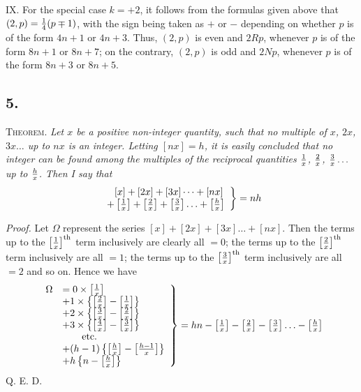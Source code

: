 \documentclass[twoside,12pt]{memoir}
\let\oldfrac\frac
\def\frac#1#2{\mathchoice{\tfrac{#1}{#2}}{\oldfrac{#1}{#2}}{\genfrac{}{}{}{2}{#1}{#2\mathstrut}}{\genfrac{}{}{}{3}{#1}{#2\mathstrut}}}
\begin{document}
IX. For the special case \(k=+2\), it follows from the formulas given above that \((2, p)=\frac{1}{4}(p \mp 1)\), with the sign being taken as \(+\) or \(-\) depending on whether \(p\) is of the form \(4n+1\) or \(4n+3\). Thus, \((2, p)\) is even and \(2 R p\), whenever \(p\) is of the form \(8n+1\) or \(8n+7\); on the contrary, \((2, p)\) is odd and \(2 N p\), whenever \(p\) is of the form \(8n+3\) or \(8n+5\).
%

\subsection*{5.}

\textsc{Theorem.} \textit{Let \(x\) be a positive non-integer quantity, such that no multiple of \(x\), \(2x\), \(3x \ldots\) up to \(nx\) is an integer.  Letting \([nx]=h\), it is easily concluded that no integer can be found among the multiples of the reciprocal quantities \(\frac{1}{x}\), \(\frac{2}{x}\), \(\frac{3}{x} \ldots\) up to \(\frac{h}{x}\). Then I say that}
\[\left.\begin{array}{l} 
\phantom{+}[x]+[2x]+[3x]\dots+[nx] \\
+\left[\frac{1}{x}\right]+\left[\frac{2}{x}\right]+\left[\frac{3}{x}\right] \ldots+\left[\frac{h}{x}\right]
\end{array}\right\}=nh\]
 
\textit{Proof.} Let \(\Omega\) represent the series \([x]+[2x]+[3x] \ldots+[nx]\). Then the terms up to the \(\left[\frac{1}{x}\right]^{\text{th}}\) term inclusively are clearly all \(=0\); the terms up to the \(\left[\frac{2}{x}\right]^{\text{th}}\) term inclusively are all \(=1\); the terms up to the \(\left[\frac{3}{x}\right]^{\text{th}}\) term inclusively are all \(=2\) and so on. Hence we have
\[\left.\begin{array}{rl}
{\Omega}&= 0 \times\left[\frac{1}{x}\right] \\
& +1 \times\left\{\left[\frac{2}{x}\right]-\left[\frac{1}{x}\right]\right\} \\
& +2 \times\left\{\left[\frac{3}{x}\right]-\left[\frac{2}{x}\right]\right\} \\
& +3 \times\left\{\left[\frac{4}{x}\right]-\left[\frac{3}{x}\right]\right\} \\
&\qquad \text{etc{.}} \\
& +(h-1)\left\{\left[\frac{h}{x}\right]-\left[\frac{h-1}{x}\right]\right\} \\
& +h\left\{n-\left[\frac{h}{x}\right]\right\}
\end{array}\right\}=hn-\left[\frac{1}{x}\right]-\left[\frac{2}{x}\right]-\left[\frac{3}{x}\right] \ldots-\left[\frac{h}{x}\right]\]
Q. E. D.
%
\end{document}
